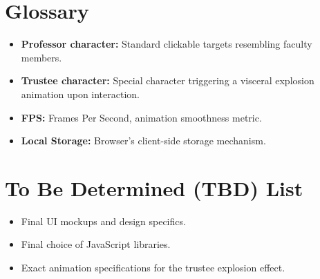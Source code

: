 \documentclass{scrreprt}
\begin{document}
\appendix

\chapter{Glossary}
\begin{itemize}
    \item \textbf{Professor character:} Standard clickable targets resembling faculty members.
    \item \textbf{Trustee character:} Special character triggering a visceral explosion animation upon interaction.
    \item \textbf{FPS:} Frames Per Second, animation smoothness metric.
    \item \textbf{Local Storage:} Browser's client-side storage mechanism.
\end{itemize}


\chapter{To Be Determined (TBD) List}
\begin{itemize}
    \item Final UI mockups and design specifics.
    \item Final choice of JavaScript libraries.
    \item Exact animation specifications for the trustee explosion effect.
\end{itemize}
\end{document}
